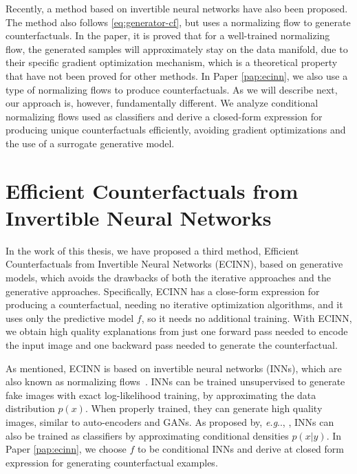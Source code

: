 \documentclass[11pt,a4paper,twoside,openright,final]{memoir}
\makeatletter
\DeclareRobustCommand\onedot{\futurelet\@let@token\@onedot}
\def\@onedot{\ifx\@let@token.\else.\null\fi\xspace}
\def\eg{\emph{e.g}\onedot} \def\Eg{\emph{E.g}\onedot}
\newcommand\contribution[1]{\hspace{0.5em}\hyperref[#1]{\ding{81}}}
\newcommand*{\paperref}[1]{Paper \hyperref[#1]{\ref{#1}}}
\makeatother
\begin{document}
Recently, a method based on invertible neural networks have also been proposed.
The method also follows \eqref{eq:generator-cf}, but uses a normalizing flow to generate counterfactuals. 
In the paper, it is proved that for a well-trained normalizing flow,  the generated samples will approximately stay on the data manifold, due to their specific gradient optimization mechanism, which is a theoretical property that have not been proved for other methods.
In \paperref{pap:ecinn}, we also use a type of normalizing flows to produce counterfactuals. 
As we will describe next, our approach is, however, fundamentally different. 
We analyze conditional normalizing flows used as classifiers and derive a closed-form expression for producing unique counterfactuals efficiently, avoiding gradient optimizations and the use of a surrogate generative model.

\section{Efficient Counterfactuals from Invertible Neural Networks\contribution{pap:ecinn}}\label{sec:ecinn}
In the work of this thesis, we have proposed a third method, Efficient Counterfactuals from Invertible Neural Networks (ECINN), based on generative models, which avoids the drawbacks of both the iterative approaches and the generative approaches.
Specifically, ECINN has a close-form expression for producing a counterfactual, needing no iterative optimization algorithms, and it uses only the predictive model $f$, so it needs no additional training. 
With ECINN, we obtain high quality explanations from just one forward pass needed to encode the input image and one backward pass needed to generate the counterfactual. 

As mentioned, ECINN is based on invertible neural networks (INNs), which are also known as normalizing flows~\cite{realnvp, nice, glow}.
INNs can be trained unsupervised to generate fake images with exact log-likelihood training, by approximating the data distribution $p(x)$.
When properly trained, they can generate high quality images, similar to auto-encoders and GANs.
As proposed by, \eg, \citet{ibinn}, INNs can also be trained as classifiers by approximating conditional densities $p(x | y)$.  
In \paperref{pap:ecinn}, we choose $f$ to be conditional INNs and derive at closed form expression for generating counterfactual examples. 
\end{document}
